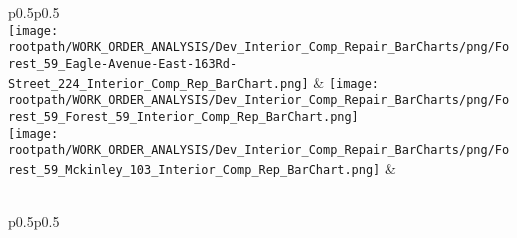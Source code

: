                         \begin{center}
                        \tablehead{\hspace{1cm}\\}
                        \tabletail{\hspace{1cm}\\}
                        \begin{supertabular}{p{0.5\textwidth}p{0.5\textwidth}}
                         \\
                        \texttt{[image: \\rootpath/WORK\_ORDER\_ANALYSIS/Dev\_Interior\_Comp\_Repair\_BarCharts/png/Forest\_59\_Eagle-Avenue-East-163Rd-Street\_224\_Interior\_Comp\_Rep\_BarChart.png]} & \texttt{[image: \\rootpath/WORK\_ORDER\_ANALYSIS/Dev\_Interior\_Comp\_Repair\_BarCharts/png/Forest\_59\_Forest\_59\_Interior\_Comp\_Rep\_BarChart.png]} \\
                                        \texttt{[image: \\rootpath/WORK\_ORDER\_ANALYSIS/Dev\_Interior\_Comp\_Repair\_BarCharts/png/Forest\_59\_Mckinley\_103\_Interior\_Comp\_Rep\_BarChart.png]} &  \hspace{1cm} \\
                                         \\
\end{supertabular}
\end{center}

                        \begin{center}
                        \tablehead{\hspace{1cm}\\}
                        \tabletail{\hspace{1cm}\\}
                        \begin{supertabular}{p{0.5\textwidth}p{0.5\textwidth}}
                         \\
                         \\
                                    \end{supertabular}
                                    \end{center}
                                    